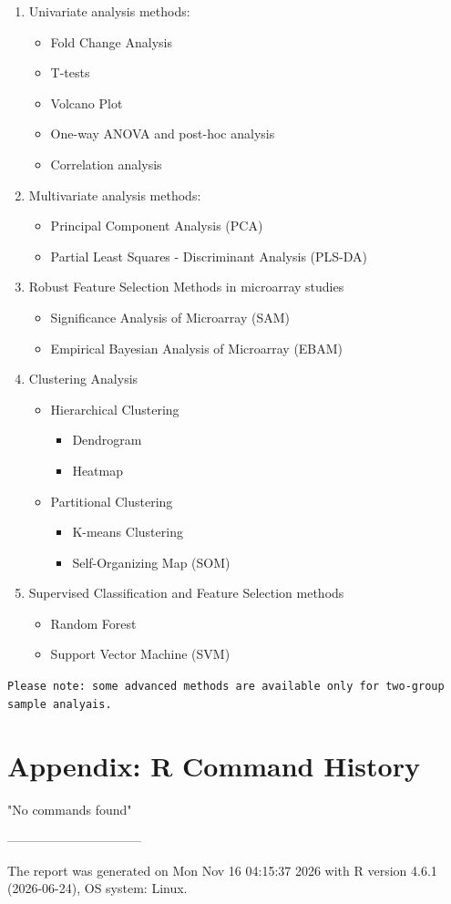 \documentclass[a4paper]{article}
\begin{document}
\begin{enumerate}
\item{Univariate analysis methods: }
\begin{itemize}
\item{Fold Change Analysis }
\item{T-tests}
\item{Volcano Plot}
\item{One-way ANOVA and post-hoc analysis}
\item{Correlation analysis}
\end{itemize}
\item{Multivariate analysis methods: }
\begin{itemize}
\item{Principal Component Analysis (PCA) }
\item{Partial Least Squares - Discriminant Analysis (PLS-DA) }
\end{itemize}
\item{Robust Feature Selection Methods in microarray studies }
\begin{itemize}
\item{Significance Analysis of Microarray (SAM)}
\item{Empirical Bayesian Analysis of Microarray (EBAM)}
\end{itemize}
\item{Clustering Analysis}
\begin{itemize}
\item{Hierarchical Clustering}
\begin{itemize}
\item{Dendrogram}
\item{Heatmap}
\end{itemize}
\item{Partitional Clustering}
\begin{itemize}
\item{K-means Clustering}
\item{Self-Organizing Map (SOM)}
\end{itemize}
\end{itemize}
\item{Supervised Classification and Feature Selection methods}
\begin{itemize}
\item{Random Forest}
\item{Support Vector Machine (SVM)}
\end{itemize}
\end{enumerate}
\texttt{Please note: some advanced methods are available only for two-group sample analyais.}
\clearpage
\section{Appendix: R Command History}
\begin{Schunk}
\begin{Soutput}
[1] "No commands found"
\end{Soutput}
\end{Schunk}
\vspace{5 mm}
--------------------------------

 The report was generated on Mon Nov 16 04:15:37 2026 with R version 4.6.1 (2026-06-24), OS system: Linux.
 
\end{document}
